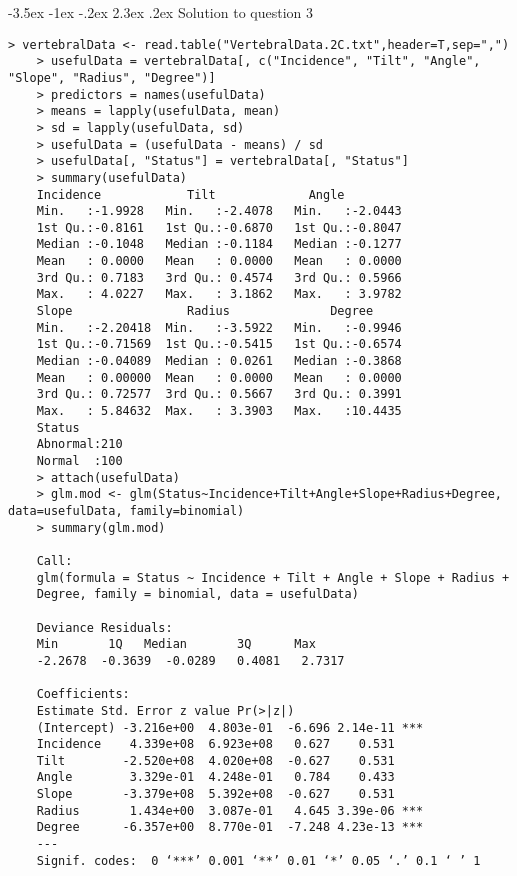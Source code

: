\documentclass[12pt]{article}
\makeatletter
\renewcommand\section{\@startsection {section}{1}{\z@}%
	{-3.5ex \@plus -1ex \@minus -.2ex}%
	{2.3ex \@plus.2ex}%
	{\normalfont\large\bfseries}}%
\makeatother
\begin{document}
	\section{Solution to question 3}
	\lstset{language=R}
	\lstset{frame=lines}
	\lstset{basicstyle=\footnotesize\ttfamily}
	\begin{lstlisting}[breaklines=true]
	> vertebralData <- read.table("VertebralData.2C.txt",header=T,sep=",")
	> usefulData = vertebralData[, c("Incidence", "Tilt", "Angle", "Slope", "Radius", "Degree")]
	> predictors = names(usefulData)
	> means = lapply(usefulData, mean)
	> sd = lapply(usefulData, sd)
	> usefulData = (usefulData - means) / sd
	> usefulData[, "Status"] = vertebralData[, "Status"]
	> summary(usefulData)
	Incidence            Tilt             Angle        
	Min.   :-1.9928   Min.   :-2.4078   Min.   :-2.0443
	1st Qu.:-0.8161   1st Qu.:-0.6870   1st Qu.:-0.8047
	Median :-0.1048   Median :-0.1184   Median :-0.1277
	Mean   : 0.0000   Mean   : 0.0000   Mean   : 0.0000
	3rd Qu.: 0.7183   3rd Qu.: 0.4574   3rd Qu.: 0.5966
	Max.   : 4.0227   Max.   : 3.1862   Max.   : 3.9782
	Slope                Radius              Degree             
	Min.   :-2.20418  Min.   :-3.5922   Min.   :-0.9946
	1st Qu.:-0.71569  1st Qu.:-0.5415   1st Qu.:-0.6574
	Median :-0.04089  Median : 0.0261   Median :-0.3868
	Mean   : 0.00000  Mean   : 0.0000   Mean   : 0.0000
	3rd Qu.: 0.72577  3rd Qu.: 0.5667   3rd Qu.: 0.3991
	Max.   : 5.84632  Max.   : 3.3903   Max.   :10.4435
	Status           
	Abnormal:210     
	Normal  :100  
	> attach(usefulData)
	> glm.mod <- glm(Status~Incidence+Tilt+Angle+Slope+Radius+Degree, data=usefulData, family=binomial)
	> summary(glm.mod)
	
	Call:
	glm(formula = Status ~ Incidence + Tilt + Angle + Slope + Radius + 
	Degree, family = binomial, data = usefulData)
	
	Deviance Residuals: 
	Min       1Q   Median       3Q      Max  
	-2.2678  -0.3639  -0.0289   0.4081   2.7317  
	
	Coefficients:
	Estimate Std. Error z value Pr(>|z|)    
	(Intercept) -3.216e+00  4.803e-01  -6.696 2.14e-11 ***
	Incidence    4.339e+08  6.923e+08   0.627    0.531    
	Tilt        -2.520e+08  4.020e+08  -0.627    0.531    
	Angle        3.329e-01  4.248e-01   0.784    0.433    
	Slope       -3.379e+08  5.392e+08  -0.627    0.531    
	Radius       1.434e+00  3.087e-01   4.645 3.39e-06 ***
	Degree      -6.357e+00  8.770e-01  -7.248 4.23e-13 ***
	---
	Signif. codes:  0 ‘***’ 0.001 ‘**’ 0.01 ‘*’ 0.05 ‘.’ 0.1 ‘ ’ 1
	

\end{lstlisting}
\end{document}
